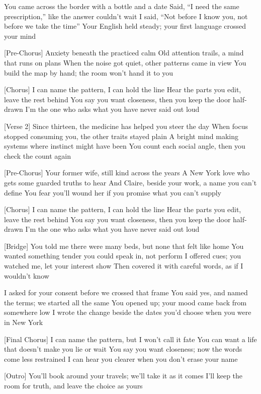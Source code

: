 \begin{lyrics}
[Verse 1]
You came across the border with a bottle and a date
Said, “I need the same prescription,” like the answer couldn’t wait
I said, “Not before I know you, not before we take the time”
Your English held steady; your first language crossed your mind

[Pre-Chorus]
Anxiety beneath the practiced calm
Old attention trails, a mind that runs on plans
When the noise got quiet, other patterns came in view
You build the map by hand; the room won’t hand it to you

[Chorus]
I can name the pattern, I can hold the line
Hear the parts you edit, leave the rest behind
You say you want closeness, then you keep the door half-drawn
I’m the one who asks what you have never said out loud

[Verse 2]
Since thirteen, the medicine has helped you steer the day
When focus stopped consuming you, the other traits stayed plain
A bright mind making systems where instinct might have been
You count each social angle, then you check the count again

[Pre-Chorus]
Your former wife, still kind across the years
A New York love who gets some guarded truths to hear
And Claire, beside your work, a name you can’t define
You fear you’ll wound her if you promise what you can’t supply

[Chorus]
I can name the pattern, I can hold the line
Hear the parts you edit, leave the rest behind
You say you want closeness, then you keep the door half-drawn
I’m the one who asks what you have never said out loud

[Bridge]
You told me there were many beds, but none that felt like home
You wanted something tender you could speak in, not perform
I offered cues; you watched me, let your interest show
Then covered it with careful words, as if I wouldn’t know

I asked for your consent before we crossed that frame
You said yes, and named the terms; we started all the same
You opened up; your mood came back from somewhere low
I wrote the change beside the dates you’d choose when you were in New York

[Final Chorus]
I can name the pattern, but I won’t call it fate
You can want a life that doesn’t make you lie or wait
You say you want closeness; now the words come less restrained
I can hear you clearer when you don’t erase your name

[Outro]
You’ll book around your travels; we’ll take it as it comes
I’ll keep the room for truth, and leave the choice as yours
\end{lyrics}

